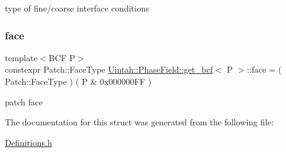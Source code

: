 type of fine/coarse interface conditions 

\mbox{\label{structUintah_1_1PhaseField_1_1get__bcf_a6d5a9f0b2a5c5f39dcdf3e8d7b61feba}} 
\subsubsection{\texorpdfstring{face}{face}}
{\footnotesize\ttfamily template$<$B\+CF P$>$ \\
constexpr Patch\+::\+Face\+Type \hyperlink{structUintah_1_1PhaseField_1_1get__bcf}{Uintah\+::\+Phase\+Field\+::get\+\_\+bcf}$<$ P $>$\+::face = ( Patch\+::\+Face\+Type ) ( P \& 0x000000\+F\+F )\hspace{0.3cm}{\ttfamily [static]}}



patch face 



The documentation for this struct was generated from the following file\+:\begin{DoxyCompactItemize}
\item 
\hyperlink{Definitions_8h}{Definitions.\+h}\end{DoxyCompactItemize}

